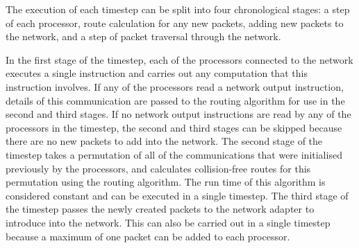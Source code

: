 \documentclass[a4paper, 12pt]{article}
\begin{document}
The execution of each timestep can be split into four chronological stages: a step of each processor, route calculation for any new packets, adding new packets to the network, and a step of packet traversal through the network. 

In the first stage of the timestep, each of the processors connected to the network executes a single instruction and carries out any computation that this instruction involves. If any of the processors read a network output instruction, details of this communication are passed to the routing algorithm for use in the second and third stages. If no network output instructions are read by any of the processors in the timestep, the second and third stages can be skipped because there are no new packets to add into the network. The second stage of the timestep takes a permutation of all of the communications that were initialised previously by the processors, and calculates collision-free routes for this permutation using the routing algorithm. The run time of this algorithm is considered constant and can be executed in a single timestep. The third stage of the timestep passes the newly created packets to the network adapter to introduce into the network. This can also be carried out in a single timestep because a maximum of one packet can be added to each processor. 
\end{document}
